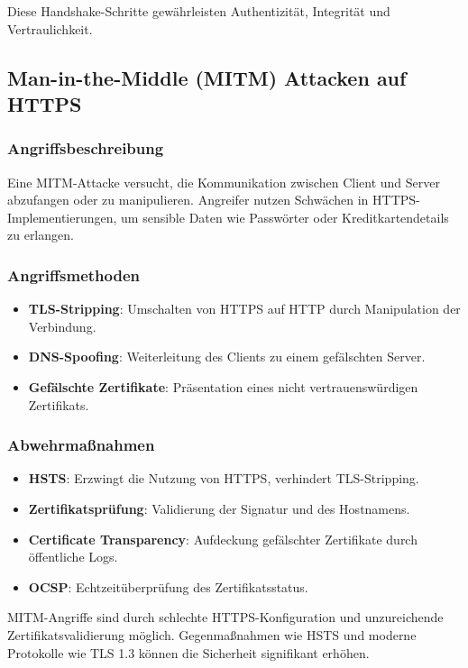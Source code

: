 \documentclass{article}
\begin{document}
Diese Handshake-Schritte gewährleisten Authentizität, Integrität und Vertraulichkeit.

\subsection{Man-in-the-Middle (MITM) Attacken auf HTTPS}

\subsubsection{Angriffsbeschreibung}
Eine MITM-Attacke versucht, die Kommunikation zwischen Client und Server abzufangen oder zu manipulieren. Angreifer nutzen Schwächen in HTTPS-Implementierungen, um sensible Daten wie Passwörter oder Kreditkartendetails zu erlangen.

\subsubsection{Angriffsmethoden}
\begin{itemize}
\item \textbf{TLS-Stripping}: Umschalten von HTTPS auf HTTP durch Manipulation der Verbindung.
\item \textbf{DNS-Spoofing}: Weiterleitung des Clients zu einem gefälschten Server.
\item \textbf{Gefälschte Zertifikate}: Präsentation eines nicht vertrauenswürdigen Zertifikats.
\end{itemize}

\subsubsection{Abwehrmaßnahmen}
\begin{itemize}
\item \textbf{HSTS}: Erzwingt die Nutzung von HTTPS, verhindert TLS-Stripping.
\item \textbf{Zertifikatsprüfung}: Validierung der Signatur und des Hostnamens.
\item \textbf{Certificate Transparency}: Aufdeckung gefälschter Zertifikate durch öffentliche Logs.
\item \textbf{OCSP}: Echtzeitüberprüfung des Zertifikatsstatus.
\end{itemize}

MITM-Angriffe sind durch schlechte HTTPS-Konfiguration und unzureichende Zertifikatsvalidierung möglich. Gegenmaßnahmen wie HSTS und moderne Protokolle wie TLS 1.3 können die Sicherheit signifikant erhöhen.
\end{document}
